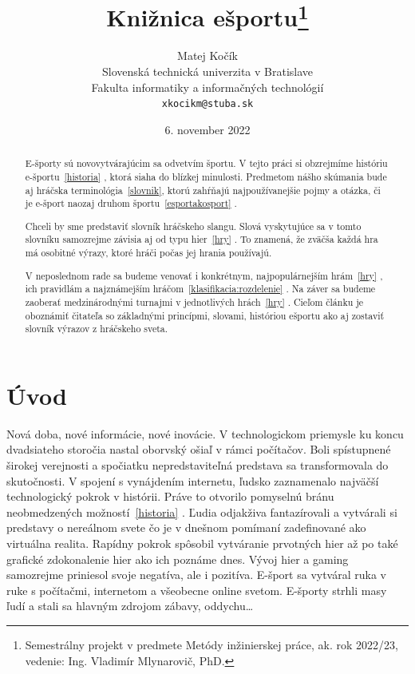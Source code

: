 \documentclass[10pt,oneside,slovak,a4paper]{article}
\title{Knižnica ešportu\thanks{Semestrálny projekt v predmete Metódy inžinierskej práce, ak. rok 2022/23, vedenie: Ing. Vladimír Mlynarovič, PhD.}} %
\author{Matej Kočík\\[2pt]
	{\small Slovenská technická univerzita v Bratislave}\\
	{\small Fakulta informatiky a informačných technológií}\\
	{\small \texttt{xkocikm@stuba.sk}}
	}
\date{\small 6. november 2022} %
\begin{document}
\maketitle

\begin{abstract}

E-športy sú novovytvárajúcim sa odvetvím športu. V tejto práci si obzrejmíme históriu e-športu~\ref{historia} , ktorá siaha do blízkej minulosti. Predmetom nášho skúmania bude aj hráčska terminológia~\ref{slovnik}, ktorú zahŕňajú najpoužívanejšie pojmy a otázka, či je e-šport naozaj druhom športu~\ref{esportakosport} . 

Chceli by sme predstaviť slovník hráčskeho slangu. Slová vyskytujúce sa v tomto slovníku samozrejme závisia aj od typu hier~\ref{hry} . To znamená, že zväčša každá hra má osobitné výrazy, ktoré hráči počas jej hrania používajú. 

V neposlednom rade sa budeme venovať i konkrétnym, najpopulárnejším hrám~\ref{hry} , ich pravidlám a najznámejším hráčom~\ref{klasifikacia:rozdelenie} . Na záver sa budeme zaoberať medzinárodnými turnajmi v jednotlivých hrách~\ref{hry} . Cieľom článku je oboznámiť čitateľa so základnými princípmi, slovami, históriou ešportu ako aj zostaviť slovník výrazov z hráčskeho sveta.
\end{abstract}



\section{Úvod}


Nová doba, nové informácie, nové inovácie. V technologickom priemysle ku koncu dvadsiateho storočia nastal oborvský ošiaľ v rámci počítačov. Boli spístupnené širokej verejnosti a spočiatku nepredstaviteľná predstava sa transformovala do skutočnosti. V spojení s vynájdením internetu, ľudsko zaznamenalo najväčší technologický pokrok v histórii. Práve to otvorilo pomyselnú bránu neobmedzených možností~\ref{historia} . Ľudia odjakživa fantazírovali a vytvárali si predstavy o nereálnom svete čo je v dnešnom pomímaní zadefinované ako virtuálna realita. Rapídny pokrok spôsobil vytváranie prvotných hier až po také grafické zdokonalenie hier ako ich poznáme dnes. Vývoj hier a gaming samozrejme priniesol svoje negatíva, ale i pozitíva. E-šport sa vytváral ruka v ruke s počítačmi, internetom a všeobecne online svetom. E-športy strhli masy ľudí a stali sa hlavným zdrojom zábavy, oddychu…\cite{a1}
\end{document}
